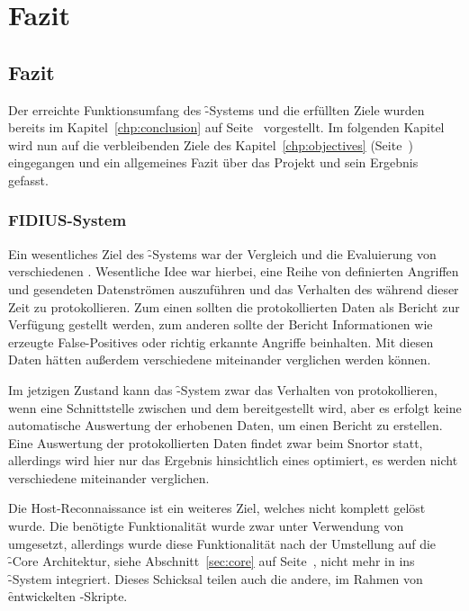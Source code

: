 \chapter{Fazit}
\label{chp:results}
\section{Fazit}
\authors{\DK \and \LM \and \MW}{\DH \and \JF \and \HM \and \DE}

Der erreichte Funktionsumfang des \f-Systems und die erfüllten Ziele
wurden bereits im Kapitel~\ref{chp:conclusion} auf
Seite~\pageref{chp:conclusion} vorgestellt. Im folgenden Kapitel wird nun
auf die verbleibenden Ziele des Kapitel~\ref{chp:objectives}
(Seite~\pageref{chp:objectives}) eingegangen und ein allgemeines Fazit über das
Projekt und sein Ergebnis gefasst.
 
\subsection{FIDIUS-System}
Ein wesentliches Ziel des \f-Systems war der Vergleich und die
Evaluierung von verschiedenen . Wesentliche Idee war hierbei, eine
Reihe von definierten Angriffen und gesendeten Datenströmen auszuführen und
das Verhalten des  während dieser Zeit zu protokollieren. Zum
einen sollten die protokollierten Daten als Bericht zur Verfügung gestellt
werden, zum anderen sollte der Bericht Informationen wie \zB erzeugte False-Positives
oder richtig erkannte Angriffe beinhalten. Mit diesen Daten hätten außerdem
verschiedene  miteinander verglichen werden können.

Im jetzigen Zustand kann das \f-System zwar das Verhalten von 
protokollieren, wenn eine Schnittstelle zwischen  und dem
 bereitgestellt wird, aber es erfolgt keine automatische
Auswertung der erhobenen Daten, um einen Bericht zu erstellen. Eine
Auswertung der protokollierten Daten findet zwar beim Snortor statt,
allerdings wird hier nur das Ergebnis hinsichtlich eines 
optimiert, es werden nicht verschiedene  miteinander
verglichen.

Die Host-Reconnaissance ist ein weiteres Ziel, welches nicht komplett gelöst wurde.
Die benötigte Funktionalität wurde zwar unter Verwendung von 
umgesetzt, allerdings wurde diese Funktionalität nach der Umstellung auf
die \f-Core Architektur, siehe Abschnitt~\ref{sec:core} auf
Seite~\pageref{sec:core}, nicht mehr in ins \f-System integriert. Dieses
Schicksal teilen auch die andere, im Rahmen von \f entwickelten -Skripte.

